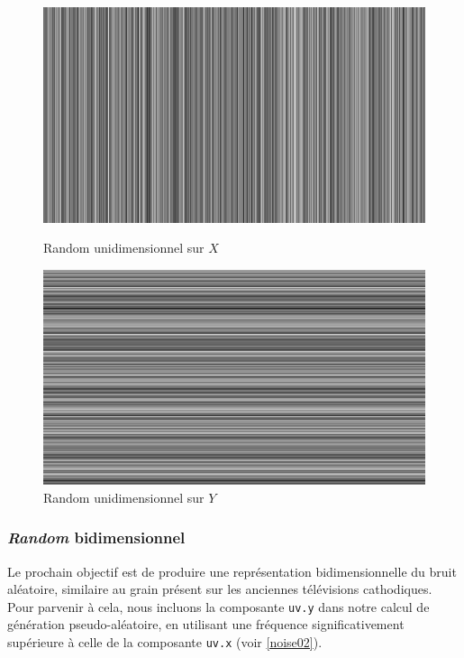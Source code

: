 \begin{figure}[h]
  \begin{minipage}[b]{0.45\linewidth}
    \centering
    \includegraphics[width=\linewidth]{images/noise/noise00.JPG}
    \caption{Random unidimensionnel sur $X$}
    \label{noise00}
  \end{minipage}
  \hspace{0.1\linewidth} %
  \begin{minipage}[b]{0.45\linewidth}
    \centering
    \includegraphics[width=\linewidth]{images/noise/noise01.JPG}
    \caption{Random unidimensionnel sur $Y$}
    \label{noise01}
  \end{minipage}
\end{figure}

\subsubsection*{\textit{Random} bidimensionnel}

Le prochain objectif est de produire une représentation bidimensionnelle du bruit aléatoire, similaire au grain présent sur les anciennes télévisions cathodiques. Pour parvenir à cela, nous incluons la composante \lstinline{uv.y} dans notre calcul de génération pseudo-aléatoire, en utilisant une fréquence significativement supérieure à celle de la composante \lstinline{uv.x} (voir \ref{noise02}).

